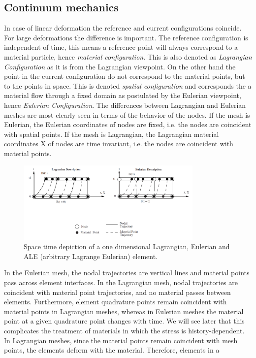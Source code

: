 \subsection{Continuum mechanics}
In case of linear deformation the reference and current configurations coincide.
For large deformations the difference is important. The reference configuration is independent of time, this means a reference point will always correspond to a material particle, hence \textit{material configuration}. This is also denoted as \textit{Lagrangian Configuration} as it is from the Lagrangian viewpoint. On the other hand the point in the current configuration do not correspond to the material points, but to the points in space. This is denoted \textit{spatial configuration} and corresponds the a material flow through a fixed domain as postulated by the Eulerian viewpoint, hence \textit{Eulerian Configuration}.
The differences between Lagrangian and Eulerian meshes are most clearly seen in terms of the behavior of the nodes. If the mesh is Eulerian, the Eulerian coordinates of nodes are fixed, i.e. the nodes are coincident with spatial points. If the mesh is Lagrangian, the Lagrangian material coordinates X of nodes are time invariant, i.e. the nodes are coincident with material points.
\begin{figure}
\centering
  \includegraphics[height=4cm]{img/ale.png}
   \caption{Space time depiction of a one dimensional Lagrangian, Eulerian and ALE (arbitrary Lagrange Eulerian) element.}
 \label{fgr:graft}
\end{figure}
In the Eulerian mesh, the nodal trajectories are vertical lines and material points pass across element interfaces.
In the Lagrangian mesh, nodal trajectories are coincident with material point trajectories, and no material passes between elements. Furthermore,
element quadrature points remain coincident with material points in Lagrangian meshes, whereas in Eulerian meshes the material point at a given
quadrature point changes with time. We will see later that this complicates the treatment of materials in which the stress is history-dependent. In Lagrangian meshes, since the material points remain coincident with mesh points, the elements deform with the material. Therefore, elements in a
